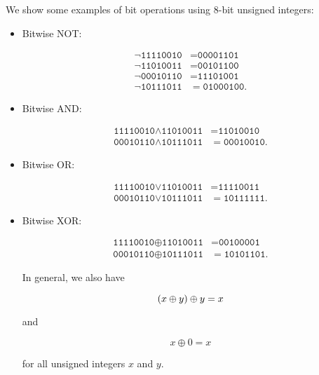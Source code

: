 \begin{example}
We show some examples of bit operations using 8-bit unsigned integers:

\begin{itemize}
\item Bitwise NOT:

\begin{align}
    \lnot\texttt{11110010} &=
         \texttt{00001101} \nonumber\\
    \lnot\texttt{11010011} &=
         \texttt{00101100} \nonumber\\
    \lnot\texttt{00010110} &=
         \texttt{11101001} \nonumber\\
    \lnot\texttt{10111011} &=
         \texttt{01000100}.
\end{align}

\item Bitwise AND:

\begin{align}
    \texttt{11110010} \land
    \texttt{11010011} &=
    \texttt{11010010} \nonumber\\
    \texttt{00010110} \land
    \texttt{10111011} &=
    \texttt{00010010}.
\end{align}

\item Bitwise OR:

\begin{align}
    \texttt{11110010} \lor
    \texttt{11010011} &=
    \texttt{11110011} \nonumber\\
    \texttt{00010110} \lor
    \texttt{10111011} &=
    \texttt{10111111}.
\end{align}

\item Bitwise XOR:

\begin{align}
    \texttt{11110010} \oplus
    \texttt{11010011} &=
    \texttt{00100001} \nonumber\\
    \texttt{00010110} \oplus
    \texttt{10111011} &=
    \texttt{10101101}.
\end{align}

In general, we also have

\begin{equation}
    \left( x \oplus y \right) \oplus y = x
\end{equation}

\noindent
and

\begin{equation}
    x \oplus 0 = x
\end{equation}

\noindent
for all unsigned integers $x$ and $y$.
\end{itemize}
\end{example}
